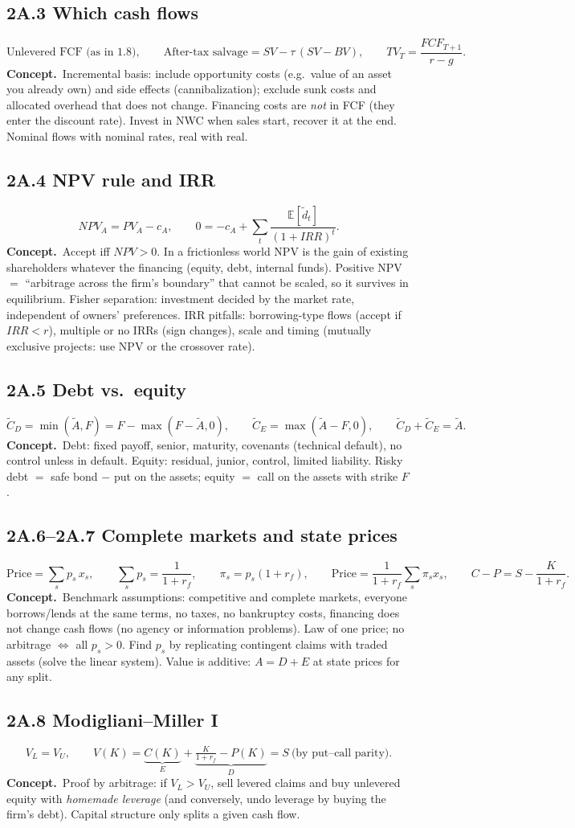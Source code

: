 \documentclass[10pt,a4paper]{article}
\newcommand{\blk}[1]{\subsection*{\color{blue!55!black}#1}}
\newcommand{\idea}{\textbf{Concept.}~}
\newcommand{\E}{\mathbb{E}}
\begin{document}
\blk{2A.3 Which cash flows}
\[
\text{Unlevered FCF (as in 1.8)},\qquad
\text{After-tax salvage}=SV-\tau\,(SV-BV),\qquad
TV_T=\frac{FCF_{T+1}}{r-g}.
\]
\idea Incremental basis: include opportunity costs (e.g.\ value of an asset you already own) and
side effects (cannibalization); exclude sunk costs and allocated overhead that does not change.
Financing costs are \emph{not} in FCF (they enter the discount rate). Invest in NWC when sales start,
recover it at the end. Nominal flows with nominal rates, real with real.

\blk{2A.4 NPV rule and IRR}
\[
NPV_A=PV_A-c_A,\qquad 0=-c_A+\sum_t\frac{\E[\tilde d_t]}{(1+IRR)^t}.
\]
\idea Accept iff $NPV>0$. In a frictionless world NPV is the gain of existing shareholders whatever
the financing (equity, debt, internal funds). Positive NPV $=$ ``arbitrage across the firm's
boundary'' that cannot be scaled, so it survives in equilibrium. Fisher separation: investment decided
by the market rate, independent of owners' preferences. IRR pitfalls: borrowing-type flows (accept if
$IRR<r$), multiple or no IRRs (sign changes), scale and timing (mutually exclusive projects: use NPV or
the crossover rate).

\blk{2A.5 Debt vs.\ equity}
\[
\tilde C_D=\min(\tilde A,F)=F-\max(F-\tilde A,0),\qquad \tilde C_E=\max(\tilde A-F,0),\qquad
\tilde C_D+\tilde C_E=\tilde A.
\]
\idea Debt: fixed payoff, senior, maturity, covenants (technical default), no control unless in
default. Equity: residual, junior, control, limited liability. Risky debt $=$ safe bond $-$ put on the
assets; equity $=$ call on the assets with strike $F$.

\blk{2A.6--2A.7 Complete markets and state prices}
\[
\text{Price}=\sum_s p_s\,x_s,\qquad \sum_s p_s=\frac{1}{1+r_f},\qquad
\pi_s=p_s(1+r_f),\qquad \text{Price}=\frac{1}{1+r_f}\sum_s\pi_s x_s,\qquad
C-P=S-\frac{K}{1+r_f}.
\]
\idea Benchmark assumptions: competitive and complete markets, everyone borrows/lends at the same
terms, no taxes, no bankruptcy costs, financing does not change cash flows (no agency or information
problems). Law of one price; no arbitrage $\Leftrightarrow$ all $p_s>0$. Find $p_s$ by replicating
contingent claims with traded assets (solve the linear system). Value is additive: $A=D+E$ at state
prices for any split.

\blk{2A.8 Modigliani--Miller I}
\[
V_L=V_U,\qquad V(K)=\underbrace{C(K)}_{E}+\underbrace{\tfrac{K}{1+r_f}-P(K)}_{D}=S\ \text{(by put--call parity)}.
\]
\idea Proof by arbitrage: if $V_L>V_U$, sell levered claims and buy unlevered equity with
\emph{homemade leverage} (and conversely, undo leverage by buying the firm's debt). Capital structure
only splits a given cash flow.
\end{document}
